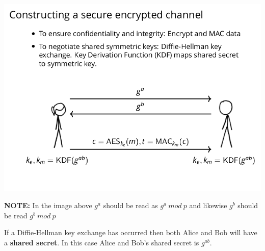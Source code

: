 \documentclass[11pt]{article} %
\begin{document}
\includegraphics[scale=.7]{./tls2.png}

{\parindent0pt \textbf{NOTE:} In the image above $g^{a}$  should be read as 
$g^{a}\ mod\ p$ and likewise $g^{b}$ should be read $g^{b}\ mod\ p$}

\bigskip
{\parindent0pt If a Diffie-Hellman key exchange has occurred then both Alice 
and Bob will have a \textbf{shared secret}. In this case Alice and Bob's shared
secret is $g^{ab}$.}
\end{document}
